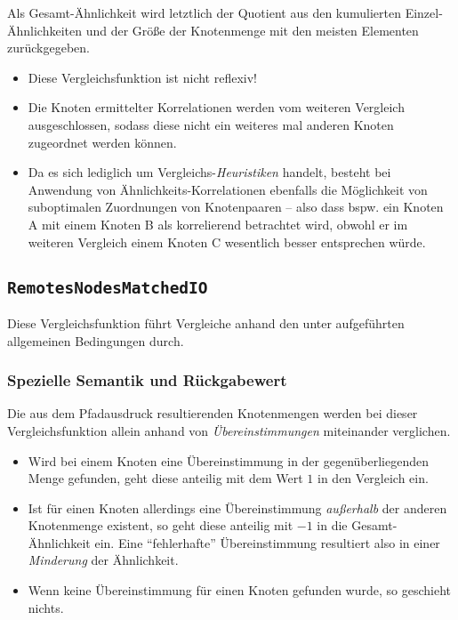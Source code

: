Als Gesamt-Ähnlichkeit wird letztlich der Quotient aus den kumulierten Einzel-Ähnlichkeiten und der Größe der Knotenmenge mit den meisten Elementen zurückgegeben.

\begin{itemize}
	\item Diese Vergleichsfunktion ist nicht reflexiv!
	\item Die Knoten ermittelter Korrelationen werden vom weiteren Vergleich ausgeschlossen, sodass diese nicht ein weiteres mal anderen Knoten zugeordnet werden können.
	\item Da es sich lediglich um Vergleichs-\emph{Heuristiken} handelt, besteht bei Anwendung von Ähnlich\-keits-Korrelationen ebenfalls die Möglichkeit von suboptimalen Zuordnungen von Knotenpaaren -- also dass bspw. ein Knoten A mit einem Knoten B als korrelierend betrachtet wird, obwohl er im weiteren Vergleich einem Knoten C wesentlich besser entsprechen würde.
\end{itemize}


%
%
\subsection{\texttt{RemotesNodesMatchedIO}}
Diese Vergleichsfunktion führt Vergleiche anhand den unter  aufgeführten allgemeinen Bedingungen durch.

\subsubsection*{Spezielle Semantik und Rückgabewert}
Die aus dem Pfadausdruck resultierenden Knotenmengen werden bei dieser Vergleichsfunktion allein anhand von \emph{Übereinstimmungen} miteinander verglichen.
\begin{itemize}
	\item Wird bei einem Knoten eine Übereinstimmung in der gegenüberliegenden Menge gefunden, geht diese anteilig mit dem Wert $1$ in den Vergleich ein.
	\item Ist für einen Knoten allerdings eine Übereinstimmung \emph{außerhalb} der anderen Knotenmenge existent, so geht diese anteilig mit $-1$ in die Gesamt-Ähnlichkeit ein. Eine "`fehlerhafte"' Übereinstimmung resultiert also in einer \emph{Minderung} der Ähnlichkeit.
	\item Wenn keine Übereinstimmung für einen Knoten gefunden wurde, so geschieht nichts.
\end{itemize}

